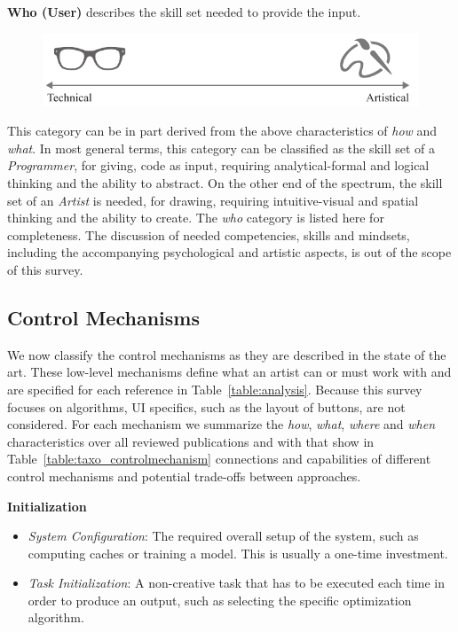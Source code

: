 \noindent\textbf{Who (User)} describes the skill set needed to provide the input. 
\begin{figure}[H]
    \centering
        \includegraphics[width=\controlParamsFigWidth\linewidth]{figures/control_paradigms/who.pdf}
\end{figure}

This category can be in part derived from the above characteristics of \textit{how} and \textit{what}. In most general terms, this category can be classified as the skill set of a \textit{Programmer}, for giving, \eg code as input, requiring analytical-formal and logical thinking and the ability to abstract. On the other end of the spectrum, the skill set of an \textit{Artist} is needed, \eg for drawing, requiring intuitive-visual and spatial thinking and the ability to create. The \textit{who} category is listed here for completeness. The discussion of needed competencies, skills and mindsets, including the accompanying psychological and artistic aspects, is out of the scope of this survey.

\subsection{Control Mechanisms}\label{subsec:taxo_control_mechanism}
We now classify the control mechanisms as they are described in the state of the art. These low-level mechanisms define what an artist can or must work with and are specified for each reference in Table~\ref{table:analysis}. Because this survey focuses on algorithms, UI specifics, such as the layout of buttons, are not considered. For each mechanism we summarize the \textit{how}, \textit{what}, \textit{where} and \textit{when} characteristics over all reviewed publications and with that show in Table~\ref{table:taxo_controlmechanism} connections and capabilities of different control mechanisms and potential trade-offs between approaches.

\noindent\textbf{Initialization}
\begin{itemize}
    \item \textit{System Configuration}: The required overall setup of the system, such as computing caches or training a model. This is usually a one-time investment.
    \item \textit{Task Initialization}: A non-creative task that has to be executed each time in order to produce an output, such as selecting the specific optimization algorithm.
\end{itemize}

